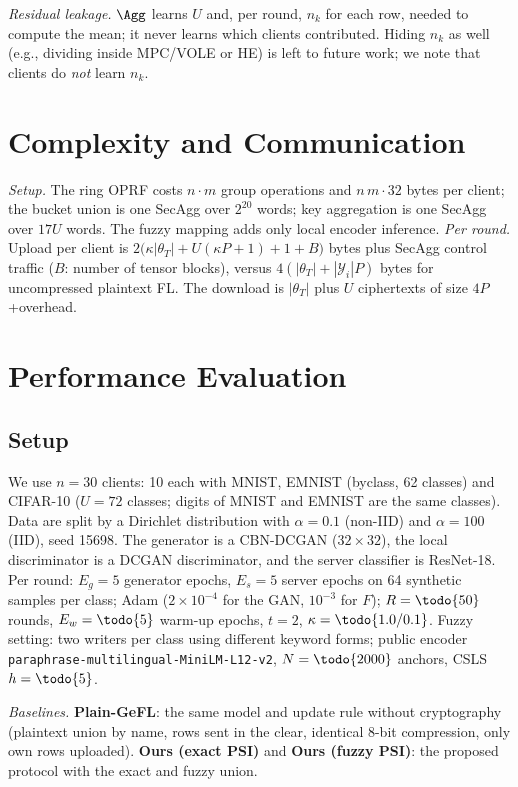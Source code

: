 \emph{Residual leakage.} $\Agg$ learns $U$ and, per round, $n_k$ for each row, needed to compute the
mean; it never learns which clients contributed. Hiding $n_k$ as well (e.g., dividing inside
MPC/VOLE or HE) is left to future work; we note that clients do \emph{not} learn $n_k$.

\section{Complexity and Communication}
\label{sec:cost}
\emph{Setup.} The ring OPRF costs $n\cdot m$ group operations and $n\,m\cdot 32$ bytes per client; the
bucket union is one SecAgg over $2^{20}$ words; key aggregation is one SecAgg over $17U$ words.
The fuzzy mapping adds only local encoder inference.
\emph{Per round.} Upload per client is $2\big(\kappa|\theta_T| + U(\kappa P+1) + 1 + B\big)$ bytes
plus SecAgg control traffic ($B$: number of tensor blocks), versus $4(|\theta_T|+|\mathcal{Y}_i|P)$
bytes for uncompressed plaintext FL. The download is $|\theta_T|$ plus $U$ ciphertexts of size
$4P$+overhead.

\section{Performance Evaluation}
\label{sec:eval}

\subsection{Setup}
We use $n=30$ clients: 10 each with MNIST, EMNIST (byclass, 62 classes) and CIFAR-10
($U=72$ classes; digits of MNIST and EMNIST are the same classes). Data are split by a Dirichlet
distribution with $\alpha=0.1$ (non-IID) and $\alpha=100$ (IID), seed 15698. The generator is a
CBN-DCGAN ($32\times32$), the local discriminator is a DCGAN discriminator, and the server classifier is
ResNet-18. Per round: $E_g=5$ generator epochs, $E_s=5$ server epochs on 64 synthetic samples per class;
Adam ($2\times10^{-4}$ for the GAN, $10^{-3}$ for $F$); $R=\todo{50}$ rounds, $E_w=\todo{5}$
warm-up epochs, $t=2$, $\kappa=\todo{1.0 / 0.1}$.
Fuzzy setting: two writers per class using different keyword forms; public encoder
\texttt{paraphrase-multilingual-MiniLM-L12-v2}, $N=\todo{2000}$ anchors, CSLS $h=\todo{5}$.

\emph{Baselines.} \textbf{Plain-GeFL}: the same model and update rule without cryptography (plaintext
union by name, rows sent in the clear, identical 8-bit compression, only own rows uploaded).
\textbf{Ours (exact PSI)} and \textbf{Ours (fuzzy PSI)}: the proposed protocol with the exact and
fuzzy union.

